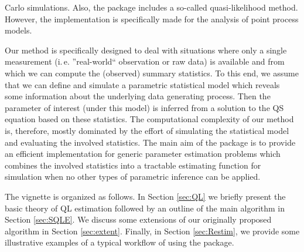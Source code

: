Carlo simulations. Also, the package  \citep{pkg:spatstat}
includes a so-called quasi-likelihood method. However, the implementation is
specifically made for the analysis of point process models.\par
%
Our method is specifically designed to deal with situations where only a single
measurement (i.\,e. ''real-world`` observation or raw data) is available and
from which we can compute the (observed) summary statistics. To this end, we
assume that we can define and simulate a parametric statistical model which reveals
some information about the underlying data generating process. Then the
parameter of interest (under this model) is inferred from a solution to the QS equation based
on these statistics. The computational complexity of our method is, therefore,
mostly dominated by the effort of simulating the statistical model and evaluating the involved statistics.
The main aim of the package is to provide an efficient implementation for
generic parameter estimation problems which combines the involved statistics
into a tractable estimating function for simulation when no other types of
parametric inference can be applied.\par
%
The vignette is organized as follows. In Section \ref{sec:QL} we briefly
present the basic theory of QL estimation followed by an outline of the main
algorithm in Section \ref{sec:SQLE}. We discuss some extensions of our originally
proposed algorithm in Section \ref{sec:extent}. Finally, in Section
\ref{sec:Restim}, we provide some illustrative examples of a typical workflow of
using the package.
%
